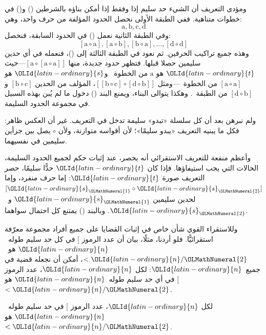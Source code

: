 \documentclass[../../../include/open-logic-section]{subfiles}
\begin{document}
ومؤدى التعريف أن الشيء حد سليم إذا وفقط إذا أمكن بناؤه بالشرطين ()
و() في خطوات متناهية. ففي الطبقة الأولى نحصل الحدود المؤلفة من حرف
واحد، وهي:
\[
\mathrm{a}, \mathrm{b}, \mathrm{c}, \mathrm{d}
\]
وفي الطبقة الثانية نعمل () في الحدود السابقة، فنحصل:
\[
[\mathrm{a} \circ \mathrm{a}], [\mathrm{a} \circ \mathrm{b}],
[\mathrm{b} \circ \mathrm{a}], \dots, [\mathrm{d} \circ \mathrm{d}]
\]
وهذه جميع تراكيب الحرفين. ثم نعود في الطبقة الثالثة إلى ()، فنعمله
في أي حدين سليمين حصلا قبلها. فتظهر حدود جديدة، منها
$[\mathrm{a} \circ [\mathrm{a} \circ \mathrm{a}]]$---حيث $\OLId{latin-ordinary}{t}$ هو
$\mathrm{a}$ من الخطوة~ و$\OLId{latin-ordinary}{s}$ هو
$[\mathrm{a} \circ \mathrm{a}]$ من الخطوة~---ومثل
$[[\mathrm{b} \circ \mathrm{c}] \circ [\mathrm{d} \circ
\mathrm{b}]]$، المؤلف من الحدين $[\mathrm{b} \circ \mathrm{c}]$
و$[\mathrm{d} \circ \mathrm{b}]$ من الطبقة~. وهكذا يتوالى البناء،
ويمنع البند () دخول ما لم يُبن بهذه السبيل في مجموعة الحدود السليمة.

ولم نبرهن بعد أن كل سلسلة «تبدو» سليمة تدخل في التعريف. غير أن العكس
ظاهر: فكل ما يبنيه التعريف «يبدو سليمًا»؛ لأن أقواسه متوازنة، ولأن
$\circ$ يصل بين جزأين سليمين في نفسيهما.

وأعظم منفعة للتعريف الاستقرائي أنه يحصر، عند إثبات حكم لجميع الحدود
السليمة، الحالات التي يجب استيفاؤها. فإذا كان $\OLId{latin-ordinary}{t}$ حدًّا سليمًا، حصر
التعريف صورة $\OLId{latin-ordinary}{t}$: إما حرف منفرد، وإما $[\OLId{latin-ordinary}{s}_\OLMathNumeral{1} \circ \OLId{latin-ordinary}{s}_\OLMathNumeral{2}]$ لحدين سليمين
$\OLId{latin-ordinary}{s}_\OLMathNumeral{1}$ و~$\OLId{latin-ordinary}{s}_\OLMathNumeral{2}$. وبالبند () يمتنع كل احتمال سواهما.

وللاستقراء القوي شأن خاص في إثبات القضايا على جميع أفراد مجموعة
معرّفة استقرائيًّا. فلو أردنا، مثلًا، بيان أن عدد الرموز $[$ في كل حد
سليم طوله~$\OLId{latin-ordinary}{n}$ هو~$< \OLId{latin-ordinary}{n}/\OLMathNumeral{2}$، أمكن أن نجعله قضية في جميع~$\OLId{latin-ordinary}{n}$: لكل $\OLId{latin-ordinary}{n}$،
عدد الرموز $[$ في أي حد سليم طوله~$\OLId{latin-ordinary}{n}$ هو $< \OLId{latin-ordinary}{n}/\OLMathNumeral{2}$.

\begin{prop}
  لكل $\OLId{latin-ordinary}{n}$، عدد الرموز $[$ في حد سليم طوله~$\OLId{latin-ordinary}{n}$ هو $< \OLId{latin-ordinary}{n}/\OLMathNumeral{2}$.
\end{prop}
\end{document}
